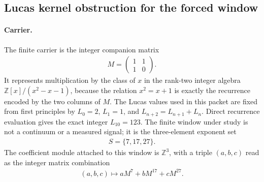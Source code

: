\subsection{Lucas kernel obstruction for the forced window}
\label{sec:window-lucas-kernel-coefficient-gauge-obstruction}

\paragraph{Carrier.}
The finite carrier is the integer companion matrix
$$
\begin{aligned}
M=\begin{pmatrix}1&1\\1&0\end{pmatrix}.
\end{aligned}
$$
It represents multiplication by the class of $x$ in the rank-two integer algebra $\mathbb{Z}[x]/(x^2-x-1)$, because the relation $x^2=x+1$ is exactly the recurrence encoded by the two columns of $M$. The Lucas values used in this packet are fixed from first principles by $L_0=2$, $L_1=1$, and $L_{n+2}=L_{n+1}+L_n$. Direct recurrence evaluation gives the exact integer $L_{10}=123$. The finite window under study is not a continuum or a measured signal; it is the three-element exponent set
$$
\begin{aligned}
S=\{7,17,27\}.
\end{aligned}
$$
The coefficient module attached to this window is $\mathbb{Z}^3$, with a triple $(a,b,c)$ read as the integer matrix combination
$$
\begin{aligned}
(a,b,c)\longmapsto aM^7+bM^{17}+cM^{27}.
\end{aligned}
$$

